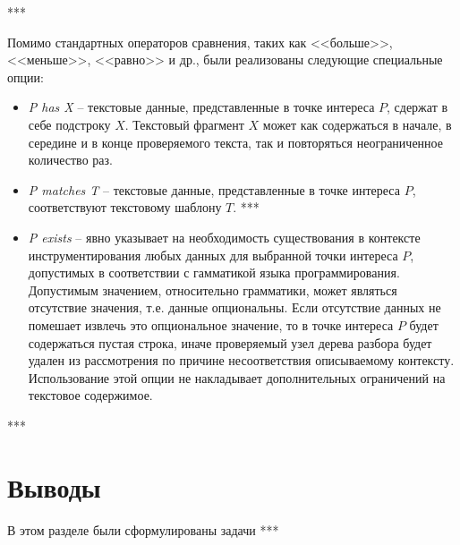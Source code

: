 ***

Помимо стандартных операторов сравнения, таких как <<больше>>, <<меньше>>, <<равно>> и др., были реализованы следующие специальные опции:
\begin{itemize}[noitemsep]
  \item \textit{P has X} --
  текстовые данные, представленные в точке интереса $P$, сдержат в себе подстроку $X$. Текстовый фрагмент $X$ может как содержаться в начале, в середине и в конце проверяемого текста, так и повторяться неограниченное количество раз.

  \item \textit{P matches T} --
  текстовые данные, представленные в точке интереса $P$, соответствуют текстовому шаблону $T$. ***

  \item \textit{P exists} --
  явно указывает на необходимость существования в контексте инструментирования любых данных для выбранной точки интереса $P$, допустимых в соответствии с гамматикой языка программирования. Допустимым значением, относительно грамматики, может являться отсутствие значения, т.е. данные опциональны. Если отсутствие данных не помешает извлечь это опциональное значение, то в точке интереса $P$ будет содержаться пустая строка, иначе проверяемый узел дерева разбора будет удален из рассмотрения по причине несоответствия описываемому контексту. Использование этой опции не накладывает дополнительных ограничений на текстовое содержимое.
\end{itemize}

***

\section{Выводы}

В этом разделе были сформулированы задачи
***

